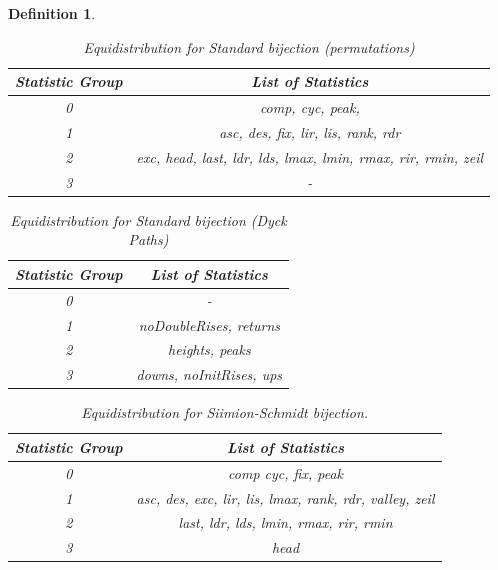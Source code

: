 \documentclass[12pt]{article}
\newtheorem{definition}{Definition}
\begin{document}
\begin{definition}
\begin{table}[H]
\caption{Equidistribution for Standard bijection (permutations)}
\centering
\begin{tabular}{c | c}
\hline\hline
Statistic Group & List of Statistics \\ [0.5ex]
\hline
0 & {comp, cyc, peak, } \\
1 & {asc, des, fix, lir, lis, rank, rdr} \\
2 & {exc, head, last, ldr, lds, lmax, lmin, rmax, rir, rmin, zeil} \\
3 & {-} \\
\hline
\end{tabular}
\label{table:EDStandardPerms}
\end{table}

\begin{table}[H]
\caption{Equidistribution for Standard bijection (Dyck Paths)}
\centering
\begin{tabular}{c | c}
\hline\hline
Statistic Group & List of Statistics \\ [0.5ex]
\hline
0 & {-} \\
1 & {noDoubleRises, returns} \\
2 & {heights, peaks} \\
3 & {downs, noInitRises, ups} \\
\hline
\end{tabular}
\label{table:EDStandardDP}
\end{table}
\newpage

\begin{table}[H]
\caption{Equidistribution for Siimion-Schmidt bijection.}
\centering
\begin{tabular}{c | c}
\hline\hline
Statistic Group & List of Statistics \\ [0.5ex]
\hline
0 & {comp cyc, fix, peak} \\
1 & {asc, des, exc, lir, lis, lmax, rank, rdr, valley, zeil} \\
2 & {last, ldr, lds, lmin, rmax, rir, rmin} \\
3 & {head} 
\hline
\end{tabular}
\label{table:EDSSPerms}
\end{table}
\newpage


\end{definition}
\end{document}
